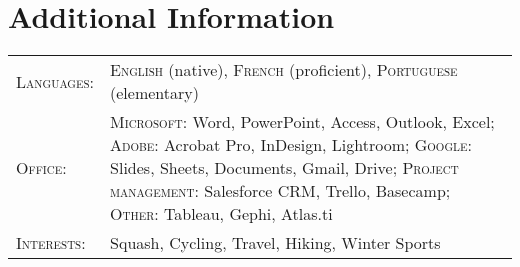 \documentclass[a4paper,10pt]{article}
\begin{document}
\section{Additional Information}
\begin{supertabular}{p{3.4cm} p{13.9cm}}
	\textsc{Languages:}			& \small\textsc{English} (native), \textsc{French} (proficient), \textsc{Portuguese} (elementary) \vspace{1mm} \\

	\textsc{Office:}					& \small\textsc{Microsoft}: \footnotesize Word, PowerPoint, Access, Outlook, Excel;	\small\textsc{Adobe}: \footnotesize Acrobat Pro, InDesign, Lightroom; \small\textsc{Google}: \footnotesize Slides, Sheets, Documents, Gmail, Drive; \small\textsc{Project management:} \footnotesize Salesforce CRM, Trello, Basecamp; \small\textsc{Other:} \footnotesize Tableau, Gephi, Atlas.ti \vspace{1mm} \\
	\textsc{Interests:} 		& \small Squash, Cycling, Travel, Hiking, Winter Sports \\

\end{supertabular}
\end{document}
